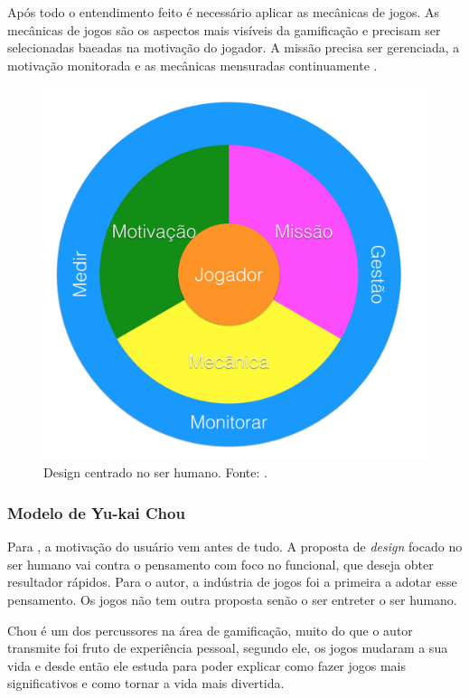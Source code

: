  Após todo o entendimento feito é necessário aplicar as mecânicas de jogos. As mecânicas de jogos são os aspectos mais visíveis da gamificação e precisam ser selecionadas baeadas na motivação do jogador. A missão precisa ser gerenciada, a motivação monitorada e as mecânicas mensuradas continuamente \cite{kumar2013gamification}.

\begin{figure}[h]
	\centering
		\includegraphics[keepaspectratio=true,scale=0.35]{figuras/pcd.png}
	\caption{Design centrado no ser humano. Fonte: \cite{kumar2013gamification}.\label{pcdfig}
}
\end{figure}

\subsubsection{Modelo de Yu-kai Chou}

Para \cite{chou2015actionable}, a motivação do usuário vem antes de tudo.  A proposta de \textit{design} focado no ser humano vai contra o pensamento com foco no funcional, que deseja obter resultador rápidos.  Para o autor, a indústria de jogos foi a primeira a adotar esse pensamento. Os jogos não tem outra proposta senão o ser entreter o ser humano.

Chou é um dos percussores na área de gamificação, muito do que o autor transmite foi fruto de experiência pessoal, segundo ele, os jogos mudaram a sua vida e desde então ele estuda para poder explicar como fazer jogos mais significativos e como tornar a vida mais divertida.

